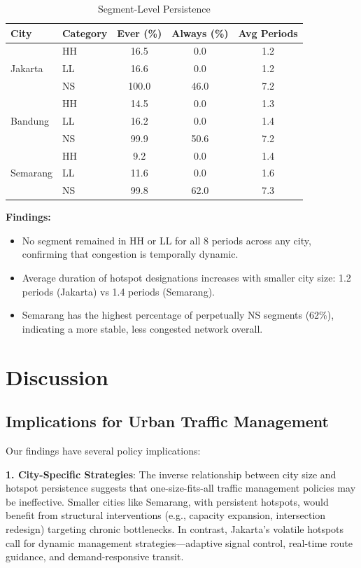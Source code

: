 \documentclass[11pt,a4paper]{article}
\begin{document}
\begin{table}[H]
\centering
\caption{Segment-Level Persistence}
\label{tab:temporal-persistence}
\begin{tabular}{@{}llccc@{}}
\toprule
City & Category & Ever (\%) & Always (\%) & Avg Periods \\
\midrule
\multirow{3}{*}{Jakarta} & HH & 16.5 & 0.0 & 1.2 \\
                         & LL & 16.6 & 0.0 & 1.2 \\
                         & NS & 100.0 & 46.0 & 7.2 \\
\midrule
\multirow{3}{*}{Bandung} & HH & 14.5 & 0.0 & 1.3 \\
                         & LL & 16.2 & 0.0 & 1.4 \\
                         & NS & 99.9 & 50.6 & 7.2 \\
\midrule
\multirow{3}{*}{Semarang} & HH & 9.2 & 0.0 & 1.4 \\
                          & LL & 11.6 & 0.0 & 1.6 \\
                          & NS & 99.8 & 62.0 & 7.3 \\
\bottomrule
\end{tabular}
\end{table}

\textbf{Findings:}
\begin{itemize}
    \item No segment remained in HH or LL for all 8 periods across any city, confirming that congestion is temporally dynamic.
    \item Average duration of hotspot designations increases with smaller city size: 1.2 periods (Jakarta) vs 1.4 periods (Semarang).
    \item Semarang has the highest percentage of perpetually NS segments (62\%), indicating a more stable, less congested network overall.
\end{itemize}

\section{Discussion}

\subsection{Implications for Urban Traffic Management}

Our findings have several policy implications:

\textbf{1. City-Specific Strategies}: The inverse relationship between city size and hotspot persistence suggests that one-size-fits-all traffic management policies may be ineffective. Smaller cities like Semarang, with persistent hotspots, would benefit from structural interventions (e.g., capacity expansion, intersection redesign) targeting chronic bottlenecks. In contrast, Jakarta's volatile hotspots call for dynamic management strategies---adaptive signal control, real-time route guidance, and demand-responsive transit.
\end{document}
